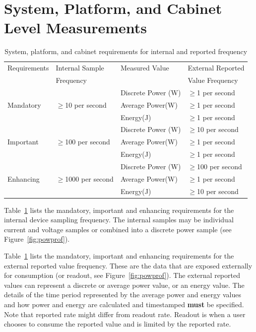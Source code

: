 \section{System, Platform, and Cabinet Level Measurements}

\begin{table}[htbp]
\caption{System, platform, and cabinet requirements for internal and reported frequency}
\label{tab:spclevel}
\centering
\begin{tabular}{ |l|l|l|l| }
\hline
Requirements & Internal Sample & Measured Value & External Reported \\
 & Frequency & & Value Frequency \\
\hline

\multirow{3}{*}{Mandatory} & \multirow{3}{*}{\mbox{$ \ge $}10 per second} &
Discrete Power (W) & \mbox{$ \ge $}1  per second \\ 
 & & Average Power(W) & \mbox{$ \ge $}1 per second \\ 
 & & Energy(J) & \mbox{$ \ge $}1 per second \\  \hline

\multirow{3}{*}{Important} & \multirow{3}{*}{\mbox{$ \ge $}100 per second} &   
Discrete Power (W) & \mbox{$ \ge $}10 per second \\ 
 & & Average Power(W) & \mbox{$ \ge $}1 per second \\ 
 & & Energy(J) & \mbox{$ \ge $}1 per second \\  \hline

\multirow{3}{*}{Enhancing} & \multirow{3}{*}{\mbox{$ \ge $}1000 per second} & 
Discrete Power (W) & \mbox{$ \ge $}100 per second \\ 
 & & Average Power(W) & \mbox{$ \ge $}1 per second \\ 
 & & Energy(J) & \mbox{$ \ge $}10 per second \\  \hline

\end{tabular}
\end{table}

Table~\ref{tab:spclevel} lists the mandatory, important and enhancing requirements for the internal 
device sampling frequency. The internal samples may be individual current and voltage 
samples or combined into a discrete power sample (see Figure~\ref{fig:powprof}). 

Table~\ref{tab:spclevel} lists the mandatory, important and enhancing requirements for the external 
reported value frequency. These are the data that are exposed externally for consumption (or 
readout, see Figure~\ref{fig:powprof}). The external reported values can represent a discrete 
or average power value, or an energy value. The details of the time period represented by 
the average power and energy values and how power and energy are calculated and timestamped \textbf{must}
be specified. Note that reported rate might differ from readout rate. Readout is when a user 
chooses to consume the reported value and is limited by the reported rate.

